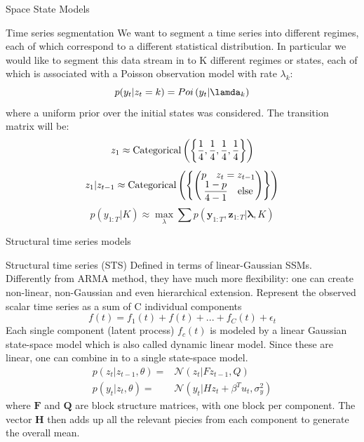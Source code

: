 \documentclass[11pt]{beamer}
\begin{document}
\begin{frame}{Space State Models  \cite{pml2Book}}
\small
\begin{exampleblock}{Time series segmentation}
We want to segment a time series into different regimes, each of which correspond to a different statistical distribution. In particular we would like to segment this data stream in to K different regimes or states, each of which is associated with a Poisson observation model with rate $\lambda_{k}$:
\begin{equation*}
p(y_{t}|z_{t}=k)= Poi\left(y_{t}|\lamda_{k}\right)
\end{equation*}
where a uniform prior over the initial states was considered. The transition matrix will be:
\begin{equation*}
z_{1}\approx \textnormal{Categorical}\left( \left\lbrace \dfrac{1}{4},\dfrac{1}{4},\dfrac{1}{4},\dfrac{1}{4}\right\rbrace \right)
\end{equation*}
\begin{equation*}
z_{1}|z_{t-1}\approx \textnormal{Categorical}\left( \left\lbrace  \begin{pmatrix} p  \quad z_{t}=z_{t-1} \\ \dfrac{1-p}{4-1}  \quad \textnormal{else}  \end{pmatrix}  \right\rbrace \right)
\end{equation*}
\begin{equation*}
p(y_{1:T}|K)\approx \max_{\lambda}\sum p\left( \bm{y}_{1:T},\bm{z}_{1:T}| \bm{\lambda},K \right)
\end{equation*}
\end{exampleblock}
\end{frame}

\begin{frame}{Structural time series models \cite{pml2Book}}
\small
\begin{alertblock}{Structural time series (STS)}
Defined in terms of linear-Gaussian SSMs. Differently from ARMA method, they have much more flexibility: one can create non-linear, non-Gaussian and even hierarchical extension.
Represent the observed scalar time series as a sum of C individual components
\begin{equation*}
f(t)=f_{1}(t)+f(t)+...+f_{C}(t)+\epsilon_{t}
\end{equation*}
Each single component (latent process) $f_{c}(t)$ is modeled by a linear Gaussian state-space model which is also called dynamic linear model. Since these are linear, one can combine in to a single state-space model. 
\begin{equation*}
\begin{split}
p(z_{t}|z_{t-1},\theta)= & \mathcal{N}(z_{t}|Fz_{t-1},Q) \\
p(y_{t}|z_{t},\theta)= & \mathcal{N}(y_{t}|Hz_{t}+\beta^{T}u_{t},\sigma^{2}_{y})
\end{split}
\end{equation*}
where $\bm{F}$ and $\bm{Q}$ are block structure matrices, with one block per component. The vector $\bm{H}$ then adds up all the relevant piecies from each component to generate the overall mean. 
\end{alertblock}
\end{frame}
\end{document}
